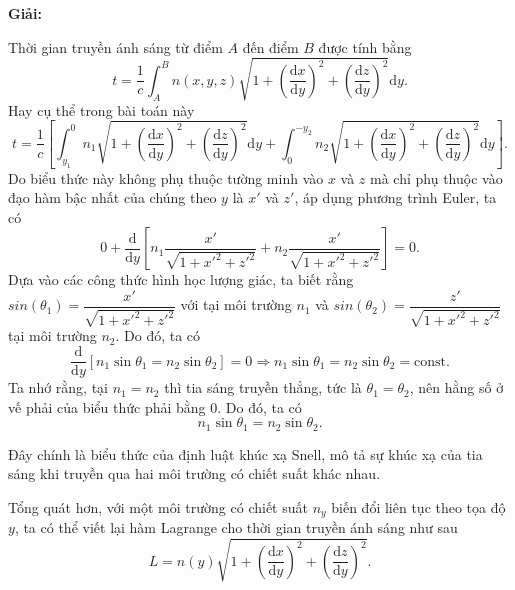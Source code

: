 \textbf{Giải:} 

Thời gian truyền ánh sáng từ điểm \(A\) đến điểm \(B\) được tính bằng
\begin{equation}
    t = \dfrac{1}{c} \int_{A}^{B} n(x,y,z) \sqrt{1 + \left( \dfrac{\mathrm{d} x}{\mathrm{d} y}\right)^2 + \left( \dfrac{\mathrm{d} z}{\mathrm{d} y}\right)^2} \mathrm{d}y.
\end{equation}
Hay cụ thể trong bài toán này
\begin{equation}
    t = \dfrac{1}{c} \left[ \int_{y_1}^{0} n_1 \sqrt{1 + \left( \dfrac{\mathrm{d} x}{\mathrm{d} y}\right)^2 + \left( \dfrac{\mathrm{d} z}{\mathrm{d} y}\right)^2} \mathrm{d}y + \int_{0}^{-y_2} n_2 \sqrt{1 + \left( \dfrac{\mathrm{d} x}{\mathrm{d} y}\right)^2 + \left( \dfrac{\mathrm{d} z}{\mathrm{d} y}\right)^2} \mathrm{d}y \right] .
\end{equation}
Do biểu thức này không phụ thuộc tường minh vào \(x\) và \(z\) mà chỉ phụ thuộc vào đạo hàm bậc nhất của chúng theo \(y\) là \(x'\) và \(z'\), áp dụng phương trình Euler, ta có
\begin{equation}
    0 + \dfrac{\mathrm{d}}{\mathrm{d}y} \left[ n_1 \dfrac{x'}{\sqrt{1+x'^2+z'^2}}  + n_2 \dfrac{x'}{\sqrt{1+x'^2+z'^2}} \right] = 0.
\end{equation}
Dựa vào các công thức hình học lượng giác, ta biết rằng \(sin \left( \theta_1 \right) = \dfrac{x'}{\sqrt{1+x'^2+z'^2}} \) với tại môi trường \(n_1\) và \(sin \left( \theta_2 \right) = \dfrac{z'}{\sqrt{1+x'^2+z'^2}} \) tại môi trường \(n_2\). Do đó, ta có
\begin{equation}
    \dfrac{\mathrm{d}}{\mathrm{d}y} \left[ n_1 \sin \theta_1 = n_2 \sin \theta_2 \right] = 0 \Rightarrow n_1 \sin \theta_1 = n_2 \sin \theta_2 = \text{const}.
\end{equation}
Ta nhớ rằng, tại \(n_1 = n_2\) thì tia sáng truyền thẳng, tức là \(\theta_1 = \theta_2\), nên hằng số ở vế phải của biểu thức phải bằng 0. Do đó, ta có
\begin{equation}    
    n_1 \sin \theta_1 = n_2 \sin \theta_2.
\end{equation}

Đây chính là biểu thức của định luật khúc xạ Snell, mô tả sự khúc xạ của tia sáng khi truyền qua hai môi trường có chiết suất khác nhau.

Tổng quát hơn, với một môi trường có chiết suất \(n_y\) biến đổi liên tục theo tọa độ \(y\), ta có thể viết lại hàm Lagrange cho thời gian truyền ánh sáng như sau
\begin{equation}
    L = n(y) \sqrt{1 + \left( \dfrac{\mathrm{d} x}{\mathrm{d} y}\right)^2 + \left( \dfrac{\mathrm{d} z}{\mathrm{d} y}\right)^2}.
\end{equation}

